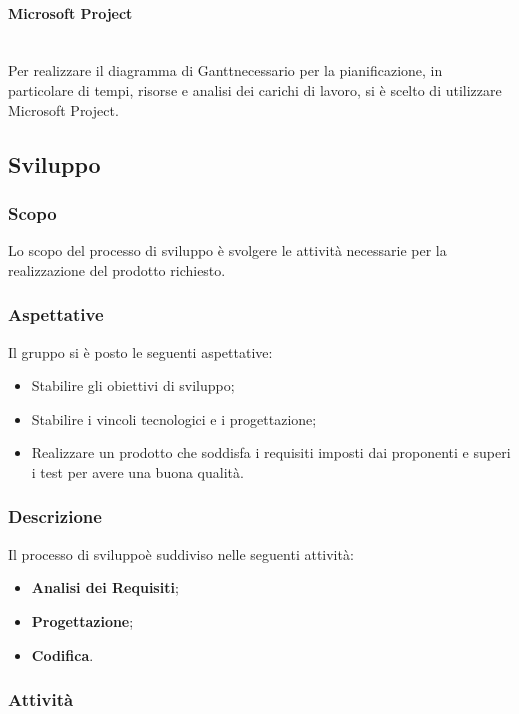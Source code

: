 \paragraph{Microsoft Project}\mbox{}\\ [1mm]
Per realizzare il diagramma di Gantt\glosp necessario per la pianificazione, in particolare di tempi, risorse e analisi dei carichi di lavoro, si è scelto di utilizzare Microsoft Project.

\subsection{Sviluppo}
\subsubsection{Scopo}
Lo scopo del processo di sviluppo è svolgere le attività necessarie per la realizzazione del prodotto richiesto.
\subsubsection{Aspettative}
Il gruppo si è posto le seguenti aspettative:
\begin{itemize}
	\item Stabilire gli obiettivi di sviluppo;
	\item Stabilire i vincoli tecnologici e i progettazione;
	\item Realizzare un prodotto che soddisfa i requisiti imposti dai proponenti e superi i test per avere una buona qualità.
\end{itemize}
\subsubsection{Descrizione}
Il processo di sviluppo\glosp è suddiviso nelle seguenti attività:
\begin{itemize}
	\item \textbf{Analisi dei Requisiti};
	\item \textbf{Progettazione};
	\item \textbf{Codifica}.
\end{itemize}
\subsubsection{Attività}
